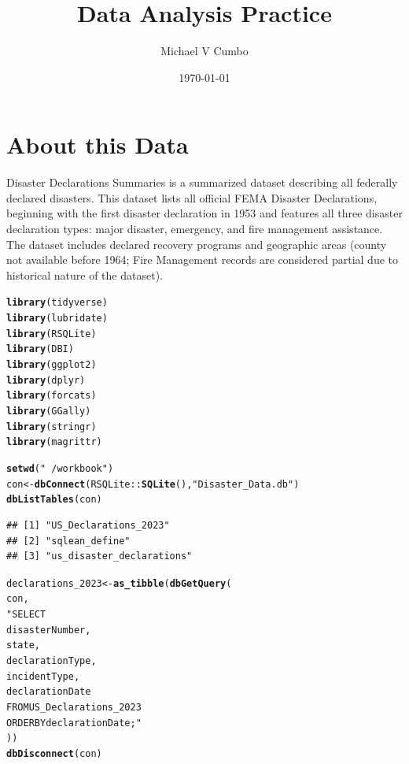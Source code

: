 \documentclass[11pt]{article}\usepackage[]{graphicx}\usepackage[]{xcolor}
\title{\textbf{Data Analysis Practice}}
\author{Michael V Cumbo}
\date{\today}
\makeatletter
\newcommand{\hlstr}[1]{\textcolor[rgb]{0.192,0.494,0.8}{#1}}%
\newcommand{\hlopt}[1]{\textcolor[rgb]{0,0,0}{#1}}%
\newcommand{\hlstd}[1]{\textcolor[rgb]{0.345,0.345,0.345}{#1}}%
\newcommand{\hlkwb}[1]{\textcolor[rgb]{0.69,0.353,0.396}{#1}}%
\newcommand{\hlkwd}[1]{\textcolor[rgb]{0.737,0.353,0.396}{\textbf{#1}}}%
\newenvironment{kframe}{%
 \def\at@end@of@kframe{}%
 \ifinner\ifhmode%
  \def\at@end@of@kframe{\end{minipage}}%
  \begin{minipage}{\columnwidth}%
 \fi\fi%
 \def\FrameCommand##1{\hskip\@totalleftmargin \hskip-\fboxsep
 \colorbox{shadecolor}{##1}\hskip-\fboxsep
     \hskip-\linewidth \hskip-\@totalleftmargin \hskip\columnwidth}%
 \MakeFramed {\advance\hsize-\width
   \@totalleftmargin\z@ \linewidth\hsize
   \@setminipage}}%
 {\par\unskip\endMakeFramed%
 \at@end@of@kframe}
\newenvironment{knitrout}{}{} %
\makeatother
\begin{document}
\maketitle
\section{About this Data}
\begin{center}
\indent\parbox{15cm}{
  Disaster Declarations Summaries is a summarized dataset describing all federally declared disasters. This dataset lists all official FEMA Disaster Declarations, beginning with the first disaster declaration in 1953 and features all three disaster declaration types: major disaster, emergency, and fire management assistance. The dataset includes declared recovery programs and geographic areas (county not available before 1964; Fire Management records are considered partial due to historical nature of the dataset).
}
\end{center}
\begin{knitrout}
\color{fgcolor}\begin{kframe}
\begin{alltt}
\hlkwd{library}\hlstd{(tidyverse)}
\hlkwd{library}\hlstd{(lubridate)}
\hlkwd{library}\hlstd{(RSQLite)}
\hlkwd{library}\hlstd{(DBI)}
\hlkwd{library}\hlstd{(ggplot2)}
\hlkwd{library}\hlstd{(dplyr)}
\hlkwd{library}\hlstd{(forcats)}
\hlkwd{library}\hlstd{(GGally)}
\hlkwd{library}\hlstd{(stringr)}
\hlkwd{library}\hlstd{(magrittr)}

\hlkwd{setwd}\hlstd{(}\hlstr{"~/workbook"}\hlstd{)}
\hlstd{con} \hlkwb{<-} \hlkwd{dbConnect}\hlstd{(RSQLite}\hlopt{::}\hlkwd{SQLite}\hlstd{(),} \hlstr{"Disaster_Data.db"}\hlstd{)}
\hlkwd{dbListTables}\hlstd{(con)}
\end{alltt}
\begin{verbatim}
## [1] "US_Declarations_2023"    
## [2] "sqlean_define"           
## [3] "us_disaster_declarations"
\end{verbatim}
\begin{alltt}
\hlstd{declarations_2023} \hlkwb{<-} \hlkwd{as_tibble}\hlstd{(}\hlkwd{dbGetQuery}\hlstd{(}
  \hlstd{con,}
  \hlstr{"SELECT
  disasterNumber,
  state,
  declarationType,
  incidentType,
  declarationDate
  FROM US_Declarations_2023
ORDER BY declarationDate;"}
\hlstd{))}
\hlkwd{dbDisconnect}\hlstd{(con)}
\end{alltt}
\end{kframe}
\end{knitrout}
\end{document}
